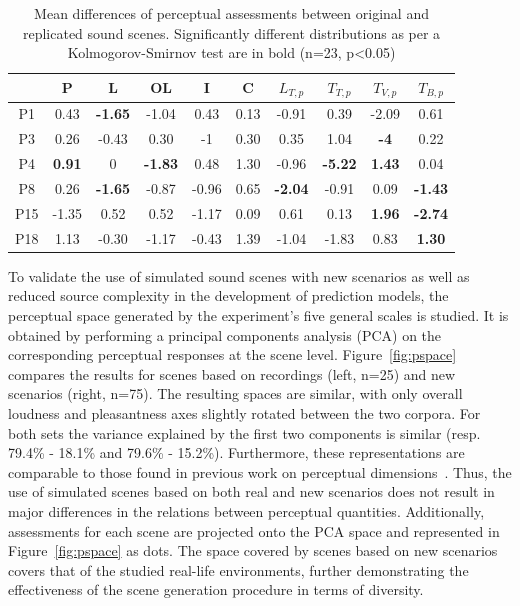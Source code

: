 \documentclass[11pt,a4paper]{article}
\begin{document}
\begin{table}[h]
\centering
\caption{Mean differences of perceptual assessments between original and replicated sound scenes. Significantly different distributions as per a Kolmogorov-Smirnov test are in bold (n=23, p<0.05)}
\label{tab:ogrep}
\begin{tabular}{ c | c c c c c c c c c }
\hline
	 & P & L & OL & I & C & $L_{T, p}$ & $T_{T, p}$ & $T_{V, p}$ & $T_{B, p}$ \\ \hline
	P1 & 0.43 & \textbf{-1.65} & -1.04 & 0.43 & 0.13 & -0.91 & 0.39 & -2.09 & 0.61 \\
	P3 & 0.26 & -0.43 & 0.30 & -1 & 0.30 & 0.35 & 1.04 & \textbf{-4} & 0.22 \\
	P4 & \textbf{0.91} & 0 & \textbf{-1.83} & 0.48 & 1.30 & -0.96 & \textbf{-5.22} & \textbf{1.43} & 0.04 \\
	P8 & 0.26 & \textbf{-1.65} & -0.87 & -0.96 & 0.65 & \textbf{-2.04} & -0.91 & 0.09 & \textbf{-1.43} \\
	P15 & -1.35 & 0.52 & 0.52 & -1.17 & 0.09 & 0.61 & 0.13 & \textbf{1.96} & \textbf{-2.74} \\
	P18 & 1.13 & -0.30 & -1.17 & -0.43 & 1.39 & -1.04 & -1.83 & 0.83 & \textbf{1.30} \\ \hline
\end{tabular}
\end{table}

To validate the use of simulated sound scenes with new scenarios as well as reduced source complexity in the development of prediction models, the perceptual space generated by the experiment's five general scales is studied. It is obtained by performing a principal components analysis (PCA) on the corresponding perceptual responses at the scene level. Figure~\ref{fig:pspace} compares the results for scenes based on recordings (left, n=25) and new scenarios (right, n=75). The resulting spaces are similar, with only overall loudness and pleasantness axes slightly rotated between the two corpora. For both sets the variance explained by the first two components is similar (resp. 79.4\% - 18.1\% and 79.6\% - 15.2\%). Furthermore, these representations are comparable to those found in previous work on perceptual dimensions~\cite{axelsson2010, cain2013}. Thus, the use of simulated scenes based on both real and new scenarios does not result in major differences in the relations between perceptual quantities. Additionally, assessments for each scene are projected onto the PCA space and represented in Figure~\ref{fig:pspace} as dots. The space covered by scenes based on new scenarios covers that of the studied real-life environments, further demonstrating the effectiveness of the scene generation procedure in terms of diversity.\\
\end{document}
